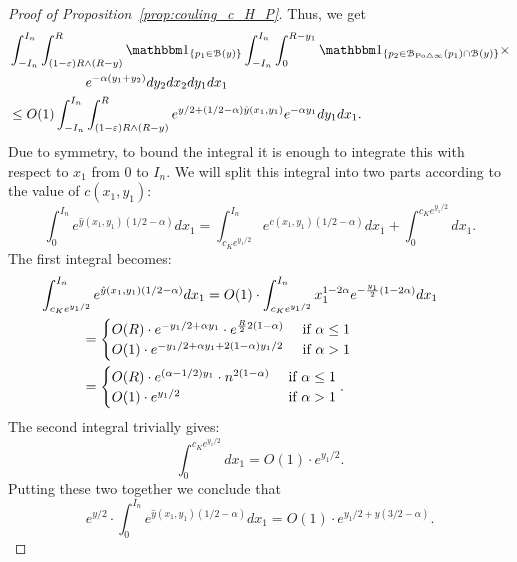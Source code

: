 \begin{proof}[Proof of Proposition~\ref{prop:couling_c_H_P}]
Thus, we get
\begin{align*}
	&\int_{-I_n}^{I_n} \int_{(1-\eps) R \wedge (R-y)}^{R} \ind{p_1 \in \BallHyp{y}}
		\int_{-I_n}^{I_n} \int_{0}^{R-y_1} 
		\ind{p_2 \in \BallSym{p_1} \cap \BallHyp{y}} \times \\ 
	& \hspace{2cm}  e^{-\alpha(y_1 + y_2)} dy_2 dx_2 dy_1 dx_1 \\
	&\leq O(1) \int_{-I_n}^{I_n} \int_{(1-\eps) R \wedge (R-y)}^{R} 
		e^{y/2 + (1/2 -\alpha) \hat{y}(x_1,y_1)} e^{-\alpha y_1} dy_1 dx_1. 
\end{align*}
Due to symmetry, to bound the integral it is enough to integrate this with respect to $x_1$ from 0 to $I_n$.
We will split this integral into two parts according to the value of $c(x_1,y_1)$:
\[
	\int_0^{I_n} e^{\hat{y}(x_1,y_1) (1/2 -\alpha)} dx_1 = 
	\int_{c_K e^{y_1/2}}^{I_n} e^{c(x_1,y_1) (1/2 -\alpha)} dx_1 + \int_0^{c_K e^{y_1/2}} dx_1.
\]
The first integral becomes: 
\begin{align*}
	&\hspace{-30pt}\int_{c_K e^{y_1/2}}^{I_n} e^{\hat{y}(x_1,y_1) (1/2 -\alpha)} dx_1  = 
 		O(1)\cdot \int_{c_K e^{y_1/2}}^{I_n} x_1^{1 -2\alpha} 
		e^{-\frac{y_1}{2} (1-2\alpha)} dx_1 \\
	&= \begin{cases}
		O(R) \cdot e^{-y_1/2 + \alpha y_1} \cdot e^{\frac{R}{2} 2(1-\alpha)} & \ \mbox{if $\alpha \leq 1$}\\
		O(1) \cdot e^{-y_1/2 + \alpha y_1 + 2(1-\alpha)y_1/2} & \ \mbox{if $\alpha > 1$}
		\end{cases}\\
	&=\begin{cases}
		O(R) \cdot e^{(\alpha -1/2) y_1} \cdot n^{2(1-\alpha)} & \ \mbox{if $\alpha \leq 1$}\\
		O(1) \cdot e^{y_1/2} &\ \mbox{if $\alpha > 1$}
	\end{cases}.  
\end{align*}
The second integral trivially gives: 
\[
	\int_0^{c_K e^{y_1/2}} dx_1 = O(1) \cdot e^{y_1/2}.
\]
Putting these two together we conclude that 
\[
	e^{y/2} \cdot \int_0^{I_n} e^{\hat{y}(x_1,y_1) (1/2 -\alpha)} dx_1
	= O(1) \cdot e^{y_1/2 +y(3/2-\alpha)}.
\]


\end{proof}
